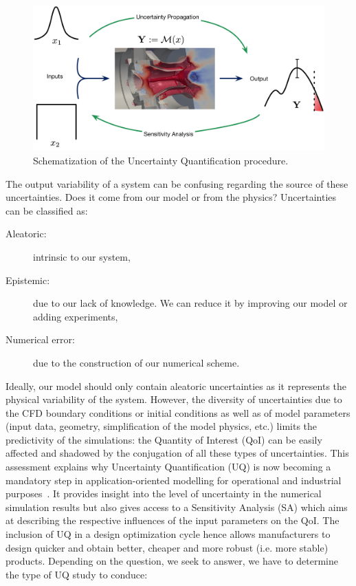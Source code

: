 \begin{figure}[!h]
\centering
\includegraphics[width=\linewidth,keepaspectratio]{fig/literature/schema_UQ.pdf}
\caption{Schematization of the Uncertainty Quantification procedure.}
\label{fig:context}
\end{figure}

The output variability of a system can be confusing regarding the source of these uncertainties. Does it come from our model or from the physics? Uncertainties can be classified as:

\begin{description}
	\item [Aleatoric:] intrinsic to our system,
	\item [Epistemic:] due to our lack of knowledge. We can reduce it by improving our model or adding experiments,
	\item [Numerical error:] due to the construction of our numerical scheme.
\end{description}

Ideally, our model should only contain aleatoric uncertainties as it represents the physical variability of the system. However, the diversity of uncertainties due to the CFD boundary conditions or initial conditions as well as of model parameters (input data, geometry, simplification of the model physics, etc.) limits the predictivity of the simulations: the Quantity of Interest (QoI) can be easily affected and shadowed by the conjugation of all these types of uncertainties. This assessment explains why Uncertainty Quantification (UQ) is now becoming a mandatory step in application-oriented modelling for operational and industrial purposes~\cite{degennaro2015,masquelet2017}. It provides insight into the level of uncertainty in the numerical simulation results but also gives access to a Sensitivity Analysis (SA) which aims at describing the respective influences of the input parameters on the QoI. The inclusion of UQ in a design optimization cycle hence allows manufacturers to design quicker and obtain better, cheaper and more robust (i.e. more stable) products. Depending on the question, we seek to answer, we have to determine the type of UQ study to conduce:

